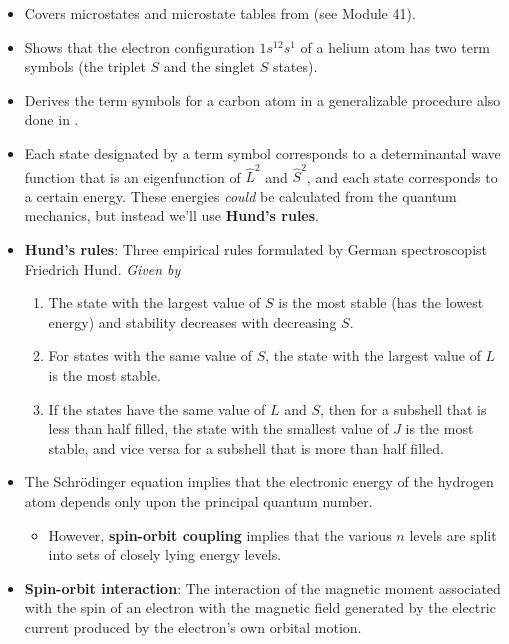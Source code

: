 \documentclass[../notes.tex]{subfiles}
\begin{document}
\begin{itemize}
\begin{itemize}
    \end{itemize}
    \item Covers microstates and microstate tables from \textcite{bib:IChemNotes} (see Module 41).
    \item Shows that the electron configuration $1s^12s^1$ of a helium atom has two term symbols (the triplet $S$ and the singlet $S$ states).
    \item Derives the term symbols for a carbon atom in a generalizable procedure also done in \textcite{bib:IChemNotes}.
    \item Each state designated by a term symbol corresponds to a determinantal wave function that is an eigenfunction of $\hat{L}^2$ and $\hat{S}^2$, and each state corresponds to a certain energy. These energies \emph{could} be calculated from the quantum mechanics, but instead we'll use \textbf{Hund's rules}.
    \item \textbf{Hund's rules}: Three empirical rules formulated by German spectroscopist Friedrich Hund. \emph{Given by}
    \begin{enumerate}
        \item The state with the largest value of $S$ is the most stable (has the lowest energy) and stability decreases with decreasing $S$.
        \item For states with the same value of $S$, the state with the largest value of $L$ is the most stable.
        \item If the states have the same value of $L$ and $S$, then for a subshell that is less than half filled, the state with the smallest value of $J$ is the most stable, and vice versa for a subshell that is more than half filled.
    \end{enumerate}
    \item The Schr\"{o}dinger equation implies that the electronic energy of the hydrogen atom depends only upon the principal quantum number.
    \begin{itemize}
        \item However, \textbf{spin-orbit coupling} implies that the various $n$ levels are split into sets of closely lying energy levels.
    \end{itemize}
    \item \textbf{Spin-orbit interaction}: The interaction of the magnetic moment associated with the spin of an electron with the magnetic field generated by the electric current produced by the electron's own orbital motion.
    \begin{itemize}

\end{itemize}
\end{itemize}
\end{document}
